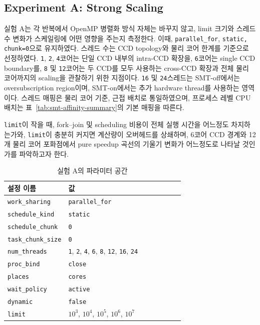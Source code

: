 \documentclass[11pt,a4paper]{article}
\begin{document}
\subsection{Experiment A: Strong Scaling}

실험 A는 각 반복에서 OpenMP 병렬화 방식 자체는 바꾸지 않고, limit 크기와 스레드 수 변화가 스케일링에 어떤 영향을 주는지 측정한다. 이때, \texttt{parallel\_for}, \texttt{static, chunk=0}으로 유지하였다. 스레드 수는 CCD topology와 물리 코어 한계를 기준으로 선정하였다. \texttt{1}, \texttt{2}, \texttt{4}코어는 단일 CCD 내부의 intra-CCD 확장을, \texttt{6}코어는 single CCD boundary를, \texttt{8} 및 \texttt{12}코어는 두 CCD를 모두 사용하는 cross-CCD 확장과 전체 물리 코어까지의 scaling을 관찰하기 위한 지점이다. \texttt{16} 및 \texttt{24}스레드는 SMT-off에서는 oversubscription region이며, SMT-on에서는 추가 hardware thread를 사용하는 영역이다. 스레드 매핑은 물리 코어 기준, 근접 배치로 통일하였으며, 프로세스 레벨 CPU 배치는 표~\ref{tab:smt-affinity-summary}의 기본 매핑을 따른다.

\texttt{limit}이 작을 때, fork--join 및 scheduling 비용이 전체 실행 시간을 어느정도 차지하는가와, \texttt{limit}이 충분히 커지면 계산량이 오버헤드를 상쇄하며, 6코어 CCD 경계와 12개 물리 코어 포화점에서 pure speedup 곡선의 기울기 변화가 어느정도로 나타날 것인가를 파악하고자 한다.

\begin{table}[h]
\centering
\begin{tabular}{lp{0.70\linewidth}}
\toprule
설정 이름 & 값 \\
\midrule
\texttt{work\_sharing} & \texttt{parallel\_for} \\
\texttt{schedule\_kind} & \texttt{static} \\
\texttt{schedule\_chunk} & \texttt{0} \\
\texttt{task\_chunk\_size} & \texttt{0} \\
\texttt{num\_threads} & \texttt{1}, \texttt{2}, \texttt{4}, \texttt{6}, \texttt{8}, \texttt{12}, \texttt{16}, \texttt{24} \\
\texttt{proc\_bind} & \texttt{close} \\
\texttt{places} & \texttt{cores} \\
\texttt{wait\_policy} & \texttt{active} \\
\texttt{dynamic} & \texttt{false} \\
\texttt{limit} & $10^3$, $10^4$, $10^5$, $10^6$, $10^7$ \\
\bottomrule
\end{tabular}
\caption{실험 A의 파라미터 공간}
\end{table}
\end{document}
